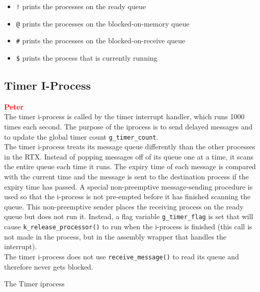 \documentclass[12pt]{report}
\begin{document}
\begin{itemize}

\item {\tt !} prints the processes on the ready queue\\
\item {\tt @} prints the processes on the blocked-on-memory queue\\
\item {\tt \#} prints the processes on the blocked-on-receive queue\\
\item {\tt \$} prints the process that is currently running\\

\end{itemize}


\subsection{Timer I-Process}

\textcolor{red}{\textbf{Peter}} \\

The timer i-process is called by the timer interrupt handler, which runs 1000 times each second. The purpose of the iprocess is to send delayed messages and to update the global timer count {\tt g\_timer\_count}.\\

The timer i-process treats its message queue differently than the other processes in the RTX. Instead of popping messages off of its queue one at a time, it scans the entire queue each time it runs. The expiry time of each message is compared with the current time and the message is sent to the destination process if the expiry time has passed. A special non-preemptive message-sending procedure is used so that the i-process is not pre-empted before it has finished scanning the queue. This non-preemptive sender places the receiving process on the ready queue but does not run it. Instead, a flag variable {\tt g\_timer\_flag} is set that will cause {\tt k\_release\_processor()} to run when the i-process is finished (this call is not made in the process, but in the assembly wrapper that handles the interrupt).\\

The timer i-process does not use {\tt receive\_message()} to read its queue and therefore never gets blocked.\\

\begin{algorithm}
  \caption{The Timer iprocess}
  \begin{algorithmic}[1]
			\EndIf
		\EndFor
    \EndProcedure
  \end{algorithmic}
\end{algorithm}
\end{document}
